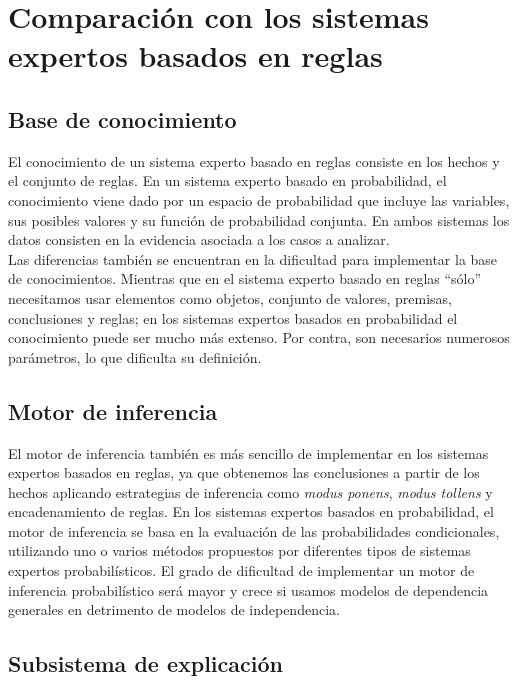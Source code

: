 \documentclass{article}
\begin{document}
\section{Comparación con los sistemas expertos basados en reglas}

\subsection{Base de conocimiento}

El conocimiento de un sistema experto basado en reglas consiste en los hechos y el conjunto de reglas. En un sistema experto basado en probabilidad, el conocimiento viene dado por un espacio de probabilidad que incluye las variables, sus posibles valores y su función de probabilidad conjunta. En ambos sistemas los datos consisten en la evidencia asociada a los casos a analizar.\\
Las diferencias también se encuentran en la dificultad para implementar la base de conocimientos. Mientras que en el sistema experto basado en reglas ``sólo'' necesitamos usar elementos como objetos, conjunto de valores, premisas, conclusiones y reglas; en los sistemas expertos basados en probabilidad el conocimiento puede ser mucho más extenso. Por contra, son necesarios numerosos parámetros, lo que dificulta su definición.

\subsection{Motor de inferencia}

El motor de inferencia también es más sencillo de implementar en los sistemas expertos basados en reglas, ya que obtenemos las conclusiones a partir de los hechos aplicando estrategias de inferencia como \textit{modus ponens}, \textit{modus tollens} y encadenamiento de reglas. En los sistemas expertos basados en probabilidad, el motor de inferencia se basa en la evaluación de las probabilidades condicionales, utilizando uno o varios métodos propuestos por diferentes tipos de sistemas expertos probabilísticos. El grado de dificultad de implementar un motor de inferencia probabilístico será mayor y crece si usamos modelos de dependencia generales en detrimento de modelos de independencia.

\subsection{Subsistema de explicación}
\end{document}
